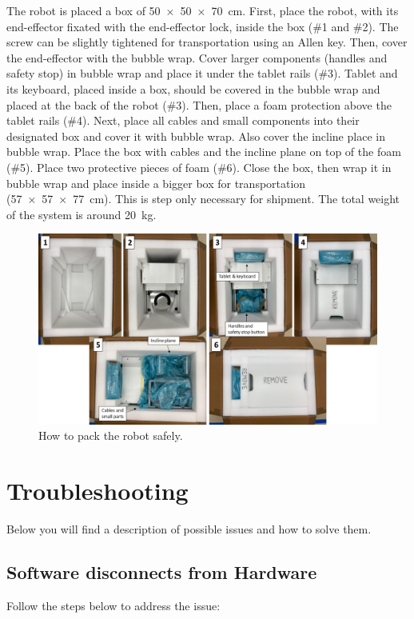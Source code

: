 \documentclass[10pt,oneside,a4paper]{article}
\begin{document}
The robot is placed a box of \SI{50x50x70}{\cm}. First, place the robot, with its end-effector fixated with the end-effector lock, inside the box (\#1 and \#2). The screw can be slightly tightened for transportation using an Allen key. Then, cover the end-effector with the bubble wrap. Cover larger components (handles and safety stop) in bubble wrap and place it under the tablet rails (\#3). Tablet and its keyboard, placed inside a box, should be covered in the bubble wrap and placed at the back of the robot (\#3). Then, place a foam protection above the tablet rails (\#4). Next, place all cables and small components into their designated box and cover it with bubble wrap. Also cover the incline place in bubble wrap. Place the box with cables and the incline plane on top of the foam (\#5). Place two protective pieces of foam (\#6). Close the box, then wrap it in bubble wrap and place inside a bigger box for transportation (\SI{57x57x77}{\cm}). This is step only necessary for shipment. The total weight of the system is around \SI{20}{\kg}. 

\begin{figure}[h!]
\begin{center}
\includegraphics[width=\columnwidth]{images/Box/Packaging.png}
\caption{How to pack the robot safely.}
\label{fig:Packaging}
\end{center}
\end{figure}
\newpage
\section{Troubleshooting}
Below you will find a description of possible issues and how to solve them. 

\subsection{Software disconnects from Hardware}
Follow the steps below to address the issue: 
\end{document}
